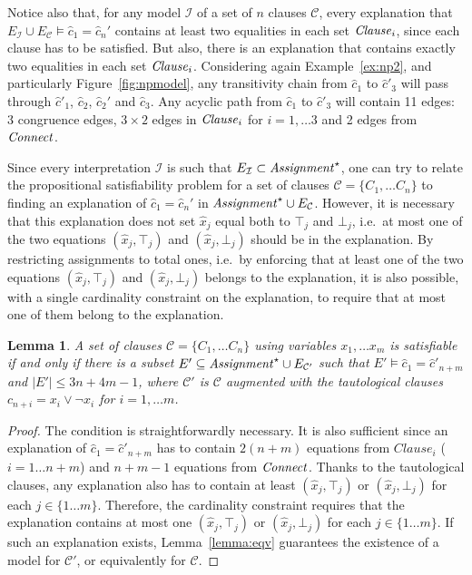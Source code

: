 \documentclass{easychair}
\newtheorem{lemma}{Lemma}
\begin{document}
\noindent Notice also that, for any model $\mathcal{I}$ of a set of $n$ clauses
$\mathcal{C}$, every explanation that $E_{\mathcal{I}} \cup E_\mathcal{C}
\models \hat{c}_1 = \hat{c}_n'$ contains at least two equalities in
each set ${\it Clause}_i$, since each clause has to be satisfied.  But also, there is
an explanation that contains exactly two equalities in each set ${\it Clause}_i$.
Considering again Example~\ref{ex:np2}, and particularly
Figure~\ref{fig:npmodel}, any transitivity chain from $\hat{c}_1$ to
$\hat{c}'_3$ will pass through $\hat{c}'_1$, $\hat{c}_2$, $\hat{c}_2'$ and
$\hat{c}_3$.  Any acyclic path from $\hat{c}_1$ to $\hat{c}'_3$ will contain 11
edges: 3 congruence edges, $3\times 2$ edges in ${\it Clause}_i$ for $i=1,\dots 3$
and 2 edges from ${\it Connect}$.

Since every interpretation $\mathcal{I}$ is such that $E_{\mathcal{I}} \subset
{\it Assignment}^\star$, one can try to relate the propositional satisfiability
problem for a set of clauses $\mathcal{C}= \{C_1, \dots C_n\}$ to finding an
explanation of $\hat{c}_1 = \hat{c}_n'$ in ${\it Assignment}^\star \cup
E_{\mathcal{C}}$.  However, it is necessary that this explanation does not set
$\hat{x}_j$ equal both to $\top_j$ and $\bot_j$, i.e.\ at most one of the two
equations $(\hat{x}_j,\top_j)$ and $(\hat{x}_j,\bot_j)$ should be in the
explanation.  By restricting assignments to total ones, i.e.\ by enforcing that
at least one of the two equations $(\hat{x}_j,\top_j)$ and $(\hat{x}_j,\bot_j)$
belongs to the explanation, it is also possible, with a single cardinality
constraint on the explanation, to require that at most one of them belong to the
explanation.


\begin{lemma}
A set of clauses $\mathcal{C}= \{C_1, \dots C_n\}$ using variables $x_1,\dots
x_m$ is satisfiable if and only if there is a subset $E' \subseteq
{\it Assignment}^\star \cup E_{\mathcal{C}'}$ such that $E'\models \hat{c}_1 =
\hat{c}'_{n+m}$ and $|E'| \leq 3n+4m-1$, where $\mathcal{C}'$ is $\mathcal{C}$
augmented with the tautological clauses $c_{n+i} = x_i \vee \neg x_i$ for
$i=1,\dots m$.
\end{lemma}
\begin{proof}
The condition is straightforwardly necessary.  It is also sufficient since an
explanation of $\hat{c}_1 = \hat{c}'_{n+m}$ has to contain $2(n + m)$
equations from $Clause_i$ ($i= 1\dots n + m$) and $n + m - 1$ equations from
${\it Connect}$.  Thanks to the tautological clauses, any explanation also has to
contain at least $(\hat{x}_j,\top_j)$ or $(\hat{x}_j,\bot_j)$ for each
$j\in\{1\dots m\}$. Therefore, the cardinality constraint requires that the explanation
contains at most one $(\hat{x}_j,\top_j)$ or $(\hat{x}_j,\bot_j)$ for each
$j\in\{1\dots m\}$.  If such an explanation exists, Lemma~\ref{lemma:eqv}
guarantees the existence of a model for $\mathcal{C'}$, or equivalently for
$\mathcal{C}$.
\end{proof}
\end{document}
